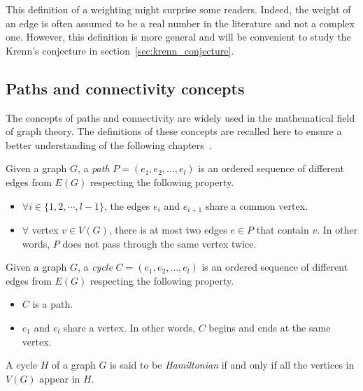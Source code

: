 This definition of a weighting might surprise some readers.
Indeed, the weight of an edge is often assumed to be a real number in the literature and not a complex one.
However, this definition is more general and will be convenient to study the Krenn's conjecture in section~\ref{sec:krenn_conjecture}.


\subsection{Paths and connectivity concepts}
\label{subsec:paths-and-connectivity-concepts}

The concepts of paths and connectivity are widely used in the mathematical field of graph theory.
The definitions of these concepts are recalled here to ensure a better understanding of the following chapters~\cite{bondy1976graph}.

\begin{definition}[Path]
    \label{def:path}
    Given a graph $G$, a \textit{path} $P = (e_1, e_2, \dots, e_l)$ is an ordered sequence of different edges from $E(G)$ respecting the following property.
    \begin{itemize}
        \item $\forall i \in \{1, 2, \cdots, l - 1\}$, the edges $e_i$ and $e_{i+1}$ share a common vertex.
        \item $\forall$ vertex $v \in V(G)$, there is at most two edges $e \in P$ that contain $v$.
            In other words, $P$ does not pass through the same vertex twice.
    \end{itemize}
\end{definition}

\begin{definition}[Cycle]
    \label{def:cycle}
    Given a graph $G$, a \textit{cycle} $C = (e_1, e_2, \dots, e_l)$ is an ordered sequence of different edges from $E(G)$ respecting the following property.
    \begin{itemize}
        \item $C$ is a path.
        \item $e_1$ and $e_l$ share a vertex.
            In other words, $C$ begins and ends at the same vertex.
    \end{itemize}
\end{definition}

\begin{definition}
    \label{def:hamiltonian_cycle}
    A cycle $H$ of a graph $G$ is said to be \textit{Hamiltonian} if and only if all the vertices in $V(G)$ appear in $H$.
\end{definition}

